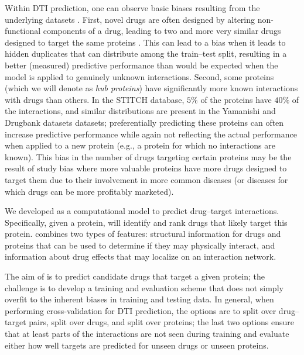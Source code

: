 \documentclass{bioinfo}
\renewcommand{\cite}{\citep}
\begin{document}
Within DTI prediction, one can observe basic biases resulting from the
underlying datasets \citep{Pahikkala2014}. First, novel drugs are
often designed by altering non-functional components of a drug,
leading to two and more very similar drugs designed to target the same
proteins \cite{Overington2006}. This can lead to a bias when it leads
to \glqq hidden duplicates\grqq{} that can distribute among the
train--test split, resulting in a better (measured) predictive
performance than would be expected when the model is applied to
genuinely unknown interactions. Second, some proteins (which we will
denote as \textit{hub proteins}) have significantly more known
interactions with drugs than others. In the STITCH database, $5\%$
of the proteins have $40\%$ of the interactions, and similar
distributions are present in the Yamanishi and Drugbank datasets
\cite{Drugbank2007, Drugbank2017} datasets; preferentially predicting
these proteins can often increase predictive performance while again
not reflecting the actual performance when applied to a new protein
(e.g., a protein for which no interactions are known). This bias in
the number of drugs targeting certain proteins may be the result of
study bias where more \glqq valuable\grqq{} proteins have more drugs
designed to target them due to their involvement in more common
diseases (or diseases for which drugs can be more profitably
marketed).

We developed \name as a computational model to predict drug--target
interactions. Specifically, given a protein, \name will identify and
rank drugs that likely target this protein. \name combines two 
types of features: structural information for drugs and proteins that
can be used to determine if they may physically interact, and
information about drug effects that may localize on an interaction
network.






The aim of \name is to predict candidate drugs that target a given
protein; the challenge is to develop a training and evaluation scheme
that does not simply overfit to the inherent biases in training and
testing data.
In general, when performing cross-validation for DTI prediction, the
options are to split over drug--target pairs, split over drugs, and
split over proteins; the last two options ensure that at least parts
of the interactions are not seen during training and evaluate either
how well targets are predicted for unseen drugs or unseen proteins.
\end{document}
